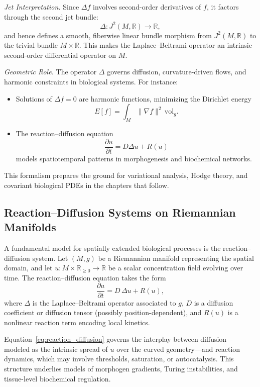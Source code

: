 \textit{Jet Interpretation.} Since $\Delta f$ involves second-order derivatives of $f$, it factors through the second jet bundle:
\[
\Delta : J^2(M, \mathbb{R}) \to \mathbb{R},
\]
and hence defines a smooth, fiberwise linear bundle morphism from $J^2(M, \mathbb{R})$ to the trivial bundle $M \times \mathbb{R}$. This makes the Laplace--Beltrami operator an intrinsic second-order differential operator on $M$.

\textit{Geometric Role.} The operator $\Delta$ governs diffusion, curvature-driven flows, and harmonic constraints in biological systems. For instance:
\begin{itemize}
  \item Solutions of $\Delta f = 0$ are harmonic functions, minimizing the Dirichlet energy
    \[
    E[f] = \int_M \|\nabla f\|^2 \, \mathrm{vol}_g.
    \]
  \item The reaction--diffusion equation
    \[
    \frac{\partial u}{\partial t} = D \Delta u + R(u)
    \]
    models spatiotemporal patterns in morphogenesis and biochemical networks.
\end{itemize}

This formalism prepares the ground for variational analysis, Hodge theory, and covariant biological PDEs in the chapters that follow.



\subsection{Reaction--Diffusion Systems on Riemannian Manifolds}

A fundamental model for spatially extended biological processes is the reaction--diffusion system. Let $(M, g)$ be a Riemannian manifold representing the spatial domain, and let $u : M \times \mathbb{R}_{\geq 0} \to \mathbb{R}$ be a scalar concentration field evolving over time. The reaction--diffusion equation takes the form
\begin{equation}
\label{eq:reaction_diffusion}
\frac{\partial u}{\partial t} = D\,\Delta u + R(u),
\end{equation}
where $\Delta$ is the Laplace--Beltrami operator associated to $g$, $D$ is a diffusion coefficient or diffusion tensor (possibly position-dependent), and $R(u)$ is a nonlinear reaction term encoding local kinetics.

Equation~\eqref{eq:reaction_diffusion} governs the interplay between diffusion—modeled as the intrinsic spread of $u$ over the curved geometry—and reaction dynamics, which may involve thresholds, saturation, or autocatalysis. This structure underlies models of morphogen gradients, Turing instabilities, and tissue-level biochemical regulation.

